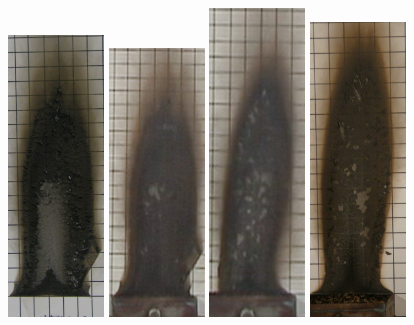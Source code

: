 \documentclass[twoside]{uocthesis}
\begin{document}
{\begin{figure}[p]
	\includegraphics[width=1.0in]{../Figures/GBNG14_P5130378}
	\includegraphics[width=1.0in]{../Figures/GBNG15}
	\includegraphics[width=1.0in]{../Figures/GBNG16}
	\includegraphics[width=1.0in]{../Figures/GBNG17_P5130382}

\end{figure}}
\end{document}
